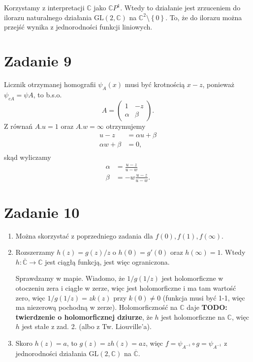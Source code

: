 Korzystamy z interpretacji \( \mathbb{C} \) jako \( \mathbb{C}P^1 \). Wtedy to działanie jest zrzuceniem do ilorazu naturalnego działania \( \mathrm{GL}(2, \mathbb{C}) \) na \( \mathbb{C}^2 \setminus \left\{ 0 \right\} \). To, że do ilorazu można przejść wynika z jednorodności funkcji liniowych.


\section*{Zadanie 9}

Licznik otrzymanej homografii \( \psi_A(x) \) musi być krotnością \( x - z \), ponieważ \( \psi_{cA} = \psi{A} \), to b.s.o.
\[ 
    A =  
    \begin{pmatrix}
        1 & -z \\
        \alpha & \beta
    \end{pmatrix}.
\]
Z równań \( A.u = 1 \) oraz \( A.w = \infty \) otrzymujemy
\begin{align*}
    u - z &= \alpha u + \beta \\
    \alpha w + \beta &= 0, \\
\end{align*}
skąd wyliczamy
\begin{align*}
    \alpha &= \frac{u-z}{u - w} \\ 
    \beta &= -w\frac{u-z}{u-w}.
\end{align*}

\section*{Zadanie 10}

\begin{enumerate}
    \item Można skorzystać z poprzedniego zadania dla \( f(0), f(1), f(\infty) \).

    \item Rozszerzamy \( h(z) = g(z)/z \) o \( h(0) = g'(0) \) oraz \( h(\infty) = 1 \). Wtedy \( h: \overline{\mathbb{C}} \to \mathbb{C} \) jest ciągłą funkcją, jest więc ograniczona.

        Sprawdzamy w mapie. Wiadomo, że \( 1/g(1/z) \) jest holomorficzne w otoczeniu zera i ciągłe w zerze, więc jest holomorficzne i ma tam wartość zero, więc \( 1/g(1/z) = zk(z) \) przy \( k(0) \neq 0 \) (funkcja musi być 1-1, więc ma niezerową pochodną w zerze). Holomorficzność na \( \mathbb{C} \) daje \textbf{TODO: twierdzenie o holomorficznej dziurze}, że \( h \) jest holomorficzne na \( \mathbb{C} \), więc \( h \) jest stałe z zad. 2. (albo z Tw. Liouville'a).

    \item Skoro \( h(z) = a \), to \( g(z) = zh(z) = az \), więc \( f = \psi_{A^{-1}} \circ g = \psi_{A^{-1}}  \) z jednorodności działania \( \mathrm{GL}(2, \mathbb{C}) \) na \( \overline{\mathbb{C}} \).
\end{enumerate}

